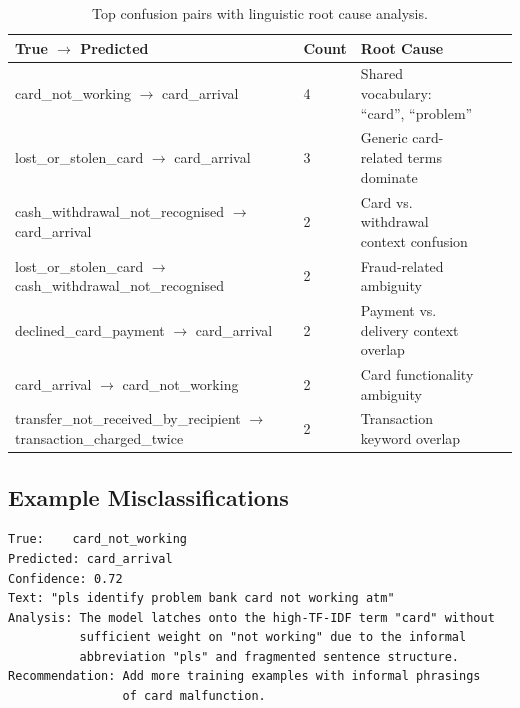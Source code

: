 \documentclass[12pt,a4paper]{article}
\renewcommand{\arraystretch}{1.5}
\newcommand{\goldrowcolors}{%
    \rowcolors{2}{bgCard}{bgDark}%
}
\newcommand{\tableheader}[1]{\textcolor{accentGold}{\textbf{#1}}}
\newcommand{\tablehdrrow}{\rowcolor{accentCard}}
\begin{document}
\begin{table}[H]
\centering
\goldrowcolors
\renewcommand{\arraystretch}{1.5}
\begin{tabular}{@{}L{7cm} V C{2cm} V L{4cm}@{}}
\toprule
\tablehdrrow
\tableheader{True $\rightarrow$ Predicted} & \tableheader{Count} & \tableheader{Root Cause} \\
\midrule
card\_not\_working $\rightarrow$ card\_arrival & 4 & Shared vocabulary: ``card'', ``problem'' \\
lost\_or\_stolen\_card $\rightarrow$ card\_arrival & 3 & Generic card-related terms dominate \\
cash\_withdrawal\_not\_recognised $\rightarrow$ card\_arrival & 2 & Card vs. withdrawal context confusion \\
lost\_or\_stolen\_card $\rightarrow$ cash\_withdrawal\_not\_recognised & 2 & Fraud-related ambiguity \\
declined\_card\_payment $\rightarrow$ card\_arrival & 2 & Payment vs. delivery context overlap \\
card\_arrival $\rightarrow$ card\_not\_working & 2 & Card functionality ambiguity \\
transfer\_not\_received\_by\_recipient $\rightarrow$ transaction\_charged\_twice & 2 & Transaction keyword overlap \\
\bottomrule
\end{tabular}
\caption{Top confusion pairs with linguistic root cause analysis.}
\label{tab:confusion-pairs}
\end{table}

\subsection{Example Misclassifications}
\label{subsec:error-examples}

\begin{codebox}
\begin{verbatim}
True:    card_not_working
Predicted: card_arrival
Confidence: 0.72
Text: "pls identify problem bank card not working atm"
Analysis: The model latches onto the high-TF-IDF term "card" without
          sufficient weight on "not working" due to the informal
          abbreviation "pls" and fragmented sentence structure.
Recommendation: Add more training examples with informal phrasings
                of card malfunction.
\end{verbatim}
\end{codebox}
\end{document}
